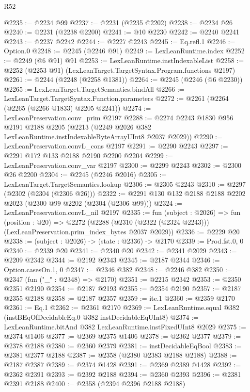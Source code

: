 \begin{lexlean}{R52}
\begin{coremodule}
@2235 := @2234 @99
@2237 := @2231 (@2235 @2202)
@2238 := @2234 @26
@2240 := @2231 (@2238 @2200)
@2241 := @10 @2230
@2242 := @2240 @2241
@2243 := @2237 @2242
@2244 := @2227 @2243
@2245 := Eq.refl.{1}
@2246 := Option.{0}
@2248 := @2245 (@2246 @91)
@2249 := LexLeanRuntime.index
@2252 := @2249 (@6 @91) @91
@2253 := LexLeanRuntime.instIndexableList
@2258 := @2252 (@2253 @91) (LexLeanTarget.TargetSyntax.Program.functions @2197)
@2261 := @2244 (@2248 (@2258 @1381))
@2264 := @2245 (@2246 (@6 @2230))
@2265 := LexLeanTarget.TargetSemantics.bindAll
@2266 := LexLeanTarget.TargetSyntax.Function.parameters
@2272 := @2261 (@2264 (@2265 (@2266 @1833) @2205 @2241))
@2274 := LexLeanPreservation.conv_prim @2197
@2288 := @2274
    @2243
    @1830
    @956
    @2191
    @2188
    @2205
    (@2213 (@2249 @2026 @382 LexLeanRuntime.instIndexableByteArrayUInt8 @2037 @2029))
@2290 := LexLeanPreservation.convL_cons @2197
@2291 := @2290 @2243
@2297 := @2291 @172 @133 @2188 @2190 @2200 @2204
@2299 := LexLeanPreservation.conv_var @2197
@2300 := @2299 @2243
@2302 := @2300 @26 @2200
@2304 := @2245 (@2246 @2016)
@2305 := LexLeanTarget.TargetSemantics.lookup
@2306 := @2305 @2243
@2310 := @2297 (@2302 (@2304 (@2306 @26)))
@2322 := @2291 @130 @132 @2188 @2188 @2202 @2023 (@2300 @99 @2202 (@2304 (@2306 @99)))
@2324 := LexLeanPreservation.convL_nil @2197
@2335 := fun (subject : @2026) =>
  fun (position : @20) =>
  @2272 (@2288 (@2310 (@2322 (@2324 @2243))) (LexLeanPreservation.prim_index_bytes @2037 @2029))
@2336 := @2229 @20
@2338 := (subject : @2026) -> (state : @2336) -> @2170
@2339 := Prod.fst.{0, 0}
@2340 := @2339 @20
@2341 := @2340 @20
@2342 := @2341 @2029
@2343 := @2209 @2342
@2344 := @2192 @2343
@2345 := @2187 @2344
@2346 := Option.casesOn.{1, 0}
@2347 := @2346 @382
@2348 := @2246 @382
@2350 := @2347 (fun ("_" : @2348) => @2170)
@2351 := @2215 @2342
@2353 := @2350 @2351 @2190
@2354 := @2187 @2193
@2355 := @2354 @2190
@2357 := @2187 @2355 @2188
@2358 := @2187 @2357
@2359 := ite.{1}
@2360 := @2359 @2170
@2361 := Eq.{1}
@2362 := @2361 @2170
@2369 := LexLeanRuntime.equal @382 (instBEqOfDecidableEq.{0} @382 instDecidableEqUInt8)
@2374 := LexLeanRuntime.bitAnd @382 LexLeanRuntime.instFixedUInt8 @2029
@2375 := @2374 @1406
@2377 := @2369 @2375 @1406
@2378 := @2362 @2377
@2379 := @2378 @2188
@2380 := @2360 @2379
@2381 := instDecidableEqBool
@2383 := @2381 @2377 @2188
@2387 := @2358 (@2380 @2383 @2188 @2188)
@2388 := @2187 @2387
@2389 := @2374 @1428
@2391 := @2369 @2389 @1428
@2392 := @2362 @2391
@2393 := @2392 @2188
@2394 := @2360 @2393
@2396 := @2381 @2391 @2188
@2400 := @2358 (@2394 @2396 @2188 @2188)

\end{coremodule}
\end{lexlean}
